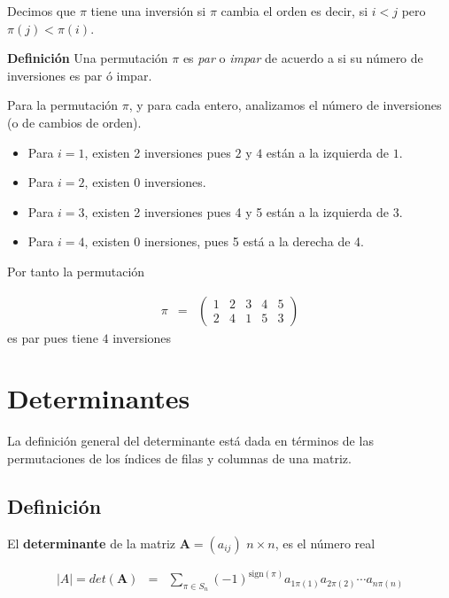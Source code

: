 \documentclass[
]{article}
\begin{document}
Decimos que \(\pi\) tiene una inversión si \(\pi\) cambia el orden es
decir, si \(i<j\) pero \(\pi(j) < \pi(i)\).

\textbf{Definición} Una permutación \(\pi\) es \emph{par} o \emph{impar}
de acuerdo a si su número de inversiones es par ó impar.

Para la permutación \(\pi\), y para cada entero, analizamos el número de
inversiones (o de cambios de orden).

\begin{itemize}
\item Para $i=1$, existen 2 inversiones pues $2$ y $4$ están a la izquierda de $1$.
\item Para $i=2$, existen 0 inversiones.
\item Para $i=3$, existen 2 inversiones pues 4 y 5 están a la izquierda de $3$.
\item Para $i=4$, existen 0 inersiones, pues 5 está a la derecha de 4.
\end{itemize}

Por tanto la permutación

\begin{equation*}
\begin{array}{ccc}
\pi &= & \begin{pmatrix} 1 & 2 & 3 & 4 & 5 \\ 2 & 4 & 1 & 5 & 3 \end{pmatrix}
\end{array}
\end{equation*} es par pues tiene \(4\) inversiones

\hypertarget{determinantes}{%
\section{Determinantes}\label{determinantes}}

La definición general del determinante está dada en términos de las
permutaciones de los índices de filas y columnas de una matriz.

\hypertarget{definiciuxf3n}{%
\subsection{Definición}\label{definiciuxf3n}}

El \textbf{determinante} de la matriz \(\mathbf{A}=(a_{ij})\)
\(n\times n\), es el número real

\begin{equation*}
\begin{array}{ccc}
\left| A \right| = det(\mathbf{A}) &= & \sum_{\pi\in S_n} (-1)^{\mbox{sign}(\pi)} a_{1\pi(1)}a_{2\pi(2)}\cdots a_{n\pi(n)}
\end{array}
\end{equation*}
\end{document}
